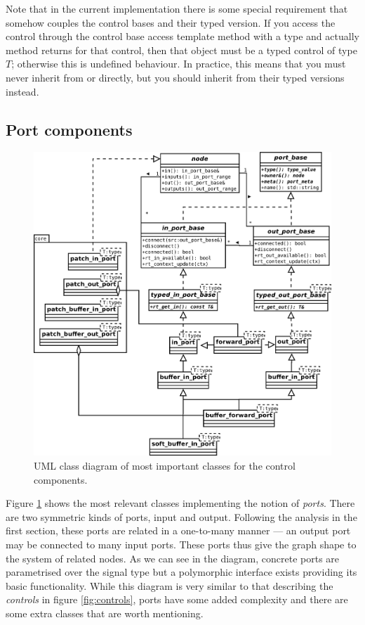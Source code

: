 Note that in the current implementation there is some special
requirement that somehow couples the control bases and their typed
version. If you access the control through the control base access
template method with a type  and actually 
method returns  for that control, then that object
must be a typed control of type $T$; otherwise this is undefined
behaviour. In practice, this means that you must never inherit from
 or  directly, but
you should inherit from their typed versions instead.

\subsection{Port components}
\label{sec:modports}

\begin{figure}[t]
  \centering
  \includegraphics[width=\textwidth]{pic/graph-port.pdf}
  \caption{UML class diagram of most important classes for the
  control components.}
\label{fig:ports}
\end{figure}

Figure \ref{fig:ports} shows the most relevant classes implementing
the notion of \emph{ports}. There are two symmetric kinds of ports,
input and output. Following the analysis in the first section, these
ports are related in a one-to-many manner --- an output port may be
connected to many input ports. These ports thus give the graph shape
to the system of related nodes. As we can see in the diagram, concrete
ports are parametrised over the signal type but a polymorphic
interface exists providing its basic functionality. While this diagram
is very similar to that describing the \emph{controls} in figure
\ref{fig:controls}, ports have some added complexity and there are
some extra classes that are worth mentioning.

